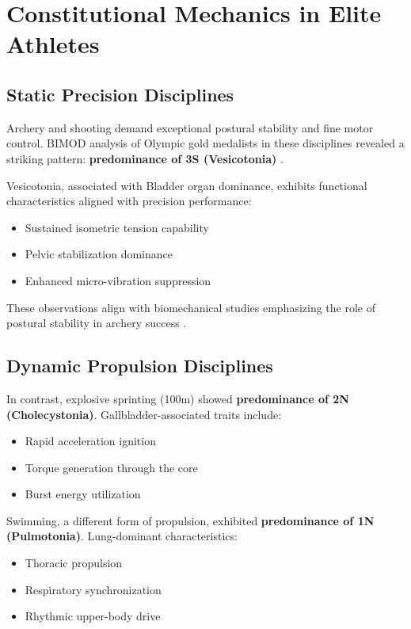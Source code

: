 \documentclass[12pt,a4paper]{article}
\begin{document}
\section{Constitutional Mechanics in Elite Athletes}

\subsection{Static Precision Disciplines}

Archery and shooting demand exceptional postural stability and fine motor control. BIMOD analysis of Olympic gold medalists in these disciplines revealed a striking pattern: \textbf{predominance of 3S (Vesicotonia)} \cite{yoon2026_200}.

Vesicotonia, associated with Bladder organ dominance, exhibits functional characteristics aligned with precision performance:

\begin{itemize}
    \item Sustained isometric tension capability
    \item Pelvic stabilization dominance
    \item Enhanced micro-vibration suppression
\end{itemize}

These observations align with biomechanical studies emphasizing the role of postural stability in archery success \cite{santos2025, fan2025, kesilmis2024}.

\subsection{Dynamic Propulsion Disciplines}

In contrast, explosive sprinting (100m) showed \textbf{predominance of 2N (Cholecystonia)}. Gallbladder-associated traits include:

\begin{itemize}
    \item Rapid acceleration ignition
    \item Torque generation through the core
    \item Burst energy utilization
\end{itemize}

Swimming, a different form of propulsion, exhibited \textbf{predominance of 1N (Pulmotonia)}. Lung-dominant characteristics:

\begin{itemize}
    \item Thoracic propulsion
    \item Respiratory synchronization
    \item Rhythmic upper-body drive
\end{itemize}
\end{document}
